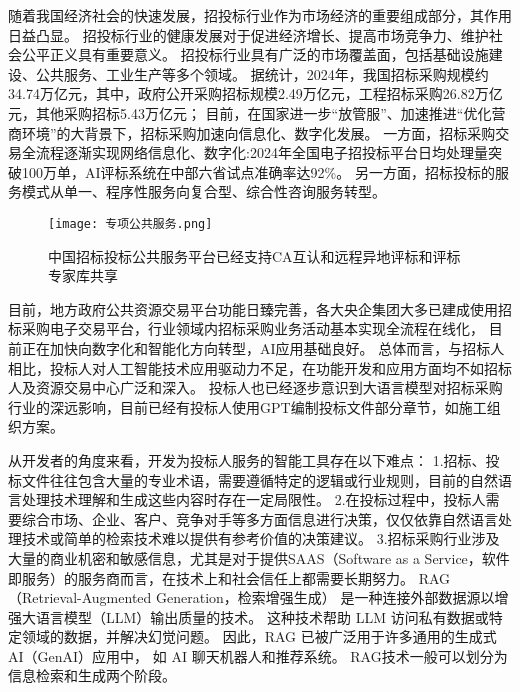 \documentclass{xmu}
\begin{document}
随着我国经济社会的快速发展，招投标行业作为市场经济的重要组成部分，其作用日益凸显。
招投标行业的健康发展对于促进经济增长、提高市场竞争力、维护社会公平正义具有重要意义。
招投标行业具有广泛的市场覆盖面，包括基础设施建设、公共服务、工业生产等多个领域。
据统计，2024年，我国招标采购规模约34.74万亿元，其中，政府公开采购招标规模2.49万亿元，工程招标采购26.82万亿元，其他采购招标5.43万亿元；\cite{chyxx}
目前，在国家进一步“放管服”、加速推进“优化营商环境”的大背景下，招标采购加速向信息化、数字化发展。\cite{zhaotoubiaoxianzhuang}
一方面，招标采购交易全流程逐渐实现网络信息化、数字化:2024年全国电子招投标平台日均处理量突破100万单，AI评标系统在中部六省试点准确率达92\%\cite{report}。
另一方面，招标投标的服务模式从单一、程序性服务向复合型、综合性咨询服务转型。
\par
\begin{figure}[!htb]
    \centering
    \texttt{[image: 专项公共服务.png]}\\
    \caption{中国招标投标公共服务平台已经支持CA互认和远程异地评标和评标专家库共享}\label{xmulogo}
\end{figure}
目前，地方政府公共资源交易平台功能日臻完善，各大央企集团大多已建成使用招标采购电子交易平台，行业领域内招标采购业务活动基本实现全流程在线化，
目前正在加快向数字化和智能化方向转型，AI应用基础良好。
总体而言，与招标人相比，投标人对人工智能技术应用驱动力不足，在功能开发和应用方面均不如招标人及资源交易中心广泛和深入。
投标人也已经逐步意识到大语言模型对招标采购行业的深远影响，目前已经有投标人使用GPT编制投标文件部分章节，如施工组织方案。\cite{AIzhanwang}
\par
从开发者的角度来看，开发为投标人服务的智能工具存在以下难点：
1.招标、投标文件往往包含大量的专业术语，需要遵循特定的逻辑或行业规则，目前的自然语言处理技术理解和生成这些内容时存在一定局限性。
2.在投标过程中，投标人需要综合市场、企业、客户、竞争对手等多方面信息进行决策，仅仅依靠自然语言处理技术或简单的检索技术难以提供有参考价值的决策建议。
3.招标采购行业涉及大量的商业机密和敏感信息，尤其是对于提供SAAS（Software as a Service，软件即服务）的服务商而言，在技术上和社会信任上都需要长期努力。
RAG（Retrieval-Augmented Generation，检索增强生成）
是一种连接外部数据源以增强大语言模型（LLM）输出质量的技术。
这种技术帮助 LLM 访问私有数据或特定领域的数据，并解决幻觉问题。
因此，RAG 已被广泛用于许多通用的生成式 AI（GenAI）应用中，
如 AI 聊天机器人和推荐系统。
RAG技术一般可以划分为信息检索和生成两个阶段。
\end{document}
